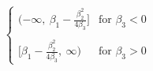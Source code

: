

\[
\left\{
\begin{array}{ll}
\left.(-\infty, \ \beta_1-\frac{\beta_2^2}{4\beta_3}\right.] & \mbox{for $\beta_3 < 0$} \\
 & \\
\left.[\beta_1-\frac{\beta_2^2}{4\beta_3}, \ \infty\right.) & \mbox{for $\beta_3 > 0$}
\end{array}
\right.
\]


